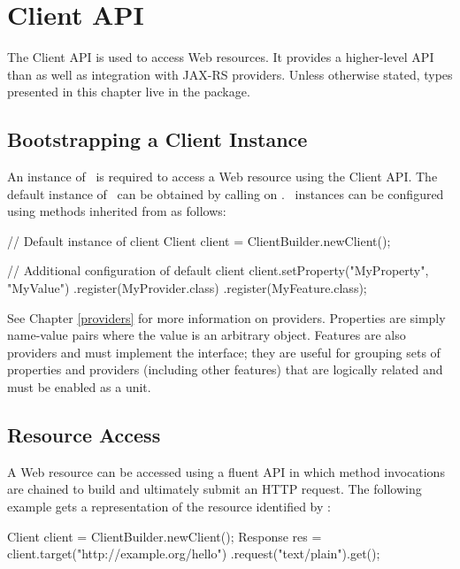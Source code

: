 \chapter{Client API}
\label{client_api}

The Client API is used to access Web resources. It provides a higher-level API than  as well as integration with JAX-RS providers. Unless otherwise stated, types presented in this chapter live in the  package.

\section{Bootstrapping a Client Instance}

An instance of \Client\ is required to access a Web resource using the Client API. The default instance of \Client\ can be obtained by calling  on \ClientBuilder. \Client\ instances can be configured using methods inherited from  as follows:

\begin{listing}{1}
// Default instance of client
Client client = ClientBuilder.newClient();

// Additional configuration of default client
client.setProperty("MyProperty", "MyValue")
      .register(MyProvider.class)
      .register(MyFeature.class);
\end{listing}

See Chapter \ref{providers} for more information on providers. Properties are simply name-value pairs where the value is an arbitrary object.  Features are also providers and must implement the  interface; they are useful for grouping sets of properties and providers (including other features) that are logically related and must be enabled as a unit.

\section{Resource Access}
\label{resource_access}

A Web resource can be accessed using a fluent API in which method	 invocations are chained to build and ultimately submit an HTTP request. The following example gets a  representation of the resource identified by :

\begin{listing}{1}
Client client = ClientBuilder.newClient();
Response res = client.target("http://example.org/hello")
    .request("text/plain").get();
\end{listing}

